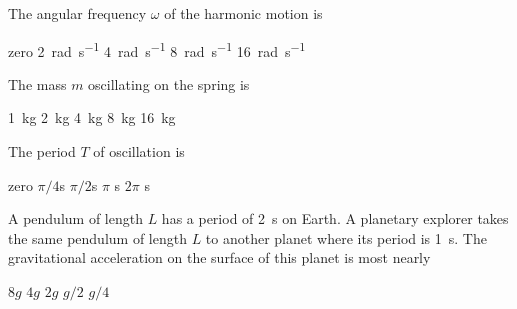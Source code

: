 \documentclass{../../oss-classkick-exam}
\begin{document}
\begin{multicols*}{2}
\begin{questions}

    \question The angular frequency $\omega$ of the harmonic motion is
    \begin{choices}
      \choice zero
      \choice\SI{2}{rad\per\second}
      \choice\SI{4}{rad\per\second}
      \choice\SI{8}{rad\per\second}
      \choice\SI{16}{rad\per\second}
    \end{choices}
    \label{first}

    \question The mass $m$ oscillating on the spring is
    \begin{choices}
      \choice\SI{1}{\kilo\gram}
      \choice\SI{2}{\kilo\gram}
      \choice\SI{4}{\kilo\gram}
      \choice\SI{8}{\kilo\gram}
      \choice\SI{16}{\kilo\gram}
    \end{choices}
    
    \question The period $T$ of oscillation is
    \begin{choices}
      \choice zero
      \choice $\pi/4$\si{\second}
      \choice $\pi/2$\si{\second}
      \choice $\pi$  \si{\second}
      \choice $2\pi$ \si{\second}
    \end{choices}
    \label{last}
    
    \question A pendulum of length $L$ has a period of \SI{2}{\second} on
    Earth. A planetary explorer takes the same pendulum of length $L$ to
    another planet where its period is \SI{1}{\second}. The gravitational
    acceleration on the surface of this planet is most nearly
    \begin{choices}
      \choice $8g$
      \choice $4g$
      \choice $2g$
      \choice $g/2$
      \choice $g/4$
    \end{choices}
  \end{questions}
\end{multicols*}
\newpage
\end{document}
